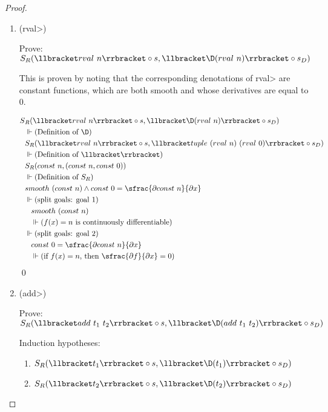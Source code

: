 \begin{proof}
\begin{enumerate}
      \item (\<rval>)

      Prove: $S_{R}(\llbracket rval\ n \rrbracket \circ s, \llbracket \D(rval\ n) \rrbracket \circ s_D)$

      This is proven by noting that the corresponding denotations of \<rval> are constant functions, which are both smooth and whose derivatives are equal to $0$.

      \begin{align*}
        S&_R(\llbracket rval\ n \rrbracket \circ s, \llbracket \D(rval\ n) \rrbracket \circ s_D) \\
        &\Vdash \text{(Definition of $\D$)}\\
        &S_R(\llbracket rval\ n \rrbracket \circ s, \llbracket tuple\ (rval\ n)\ (rval\ 0) \rrbracket \circ s_D) \\
        &\Vdash \text{(Definition of $\llbracket\rrbracket$)}\\
        &S_R(const\ n, (const\ n, const\ 0)) \\
        &\Vdash \text{(Definition of $S_R$)}\\
        &smooth\ (const\ n) \wedge
          const\ 0 = \sfrac{\partial{const\ n}}{\partial{x}} \\
        &\Vdash \text{(split goals: goal 1)}\\
        &\;\;\;smooth\ (const\ n) \\
        &\;\;\;\Vdash \text{($f(x) = n$ is continuously differentiable)}\\
        &\Vdash \text{(split goals: goal 2)}\\
        &\;\;\;const\ 0 = \sfrac{\partial{const\ n}}{\partial{x}} \\
        &\;\;\;\Vdash \text{(if $f(x) = n$, then $\sfrac{\partial{f}}{\partial{x}} = 0$)}
      \end{align*} \qed
      \item (\<add>)

      Prove: $S_R(\llbracket add\ t_1\ t_2 \rrbracket \circ s, \llbracket \D(add\ t_1\ t_2) \rrbracket \circ s_D)$

      Induction hypotheses:
      \begin{enumerate}
        \item \label{eqn:subst_ih_add1}$S_R(\llbracket t_1 \rrbracket \circ s, \llbracket \D(t_1) \rrbracket \circ s_D)$
        \item \label{eqn:subst_ih_add2}$S_R(\llbracket t_2 \rrbracket \circ s, \llbracket \D(t_2) \rrbracket \circ s_D)$
      \end{enumerate}


\end{enumerate}
\end{proof}
